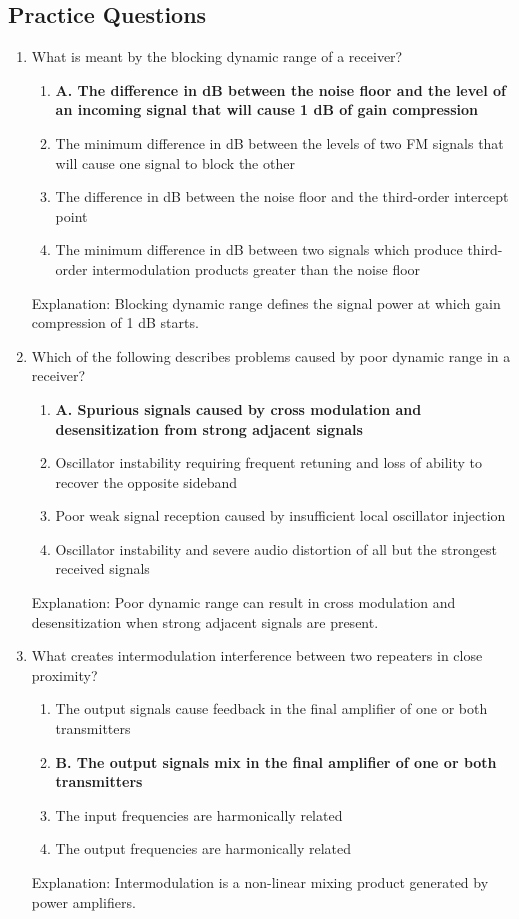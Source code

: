 \subsection*{Practice Questions}
\begin{enumerate}
      \item What is meant by the blocking dynamic range of a receiver?
    \begin{enumerate}
       \item \textbf{A. The difference in dB between the noise floor and the level of an incoming signal that will cause 1 dB of gain compression}
        \item  The minimum difference in dB between the levels of two FM signals that will cause one signal to block the other
        \item  The difference in dB between the noise floor and the third-order intercept point
        \item  The minimum difference in dB between two signals which produce third-order intermodulation products greater than the noise floor
      \end{enumerate}
    \textcolor{myred}{Explanation:}
    Blocking dynamic range defines the signal power at which gain compression of 1 dB starts.
     
        \item Which of the following describes problems caused by poor dynamic range in a receiver?
        \begin{enumerate}
        \item \textbf{A. Spurious signals caused by cross modulation and desensitization from strong adjacent signals}
       \item  Oscillator instability requiring frequent retuning and loss of ability to recover the opposite sideband
          \item  Poor weak signal reception caused by insufficient local oscillator injection
         \item  Oscillator instability and severe audio distortion of all but the strongest received signals
        \end{enumerate}
       \textcolor{myred}{Explanation:}
     Poor dynamic range can result in cross modulation and desensitization when strong adjacent signals are present.

    \item What creates intermodulation interference between two repeaters in close proximity?
     \begin{enumerate}
      \item  The output signals cause feedback in the final amplifier of one or both transmitters
       \item \textbf{B. The output signals mix in the final amplifier of one or both transmitters}
    \item  The input frequencies are harmonically related
     \item  The output frequencies are harmonically related
        \end{enumerate}
       \textcolor{myred}{Explanation:}
      Intermodulation is a non-linear mixing product generated by power amplifiers.
      

\end{enumerate}

